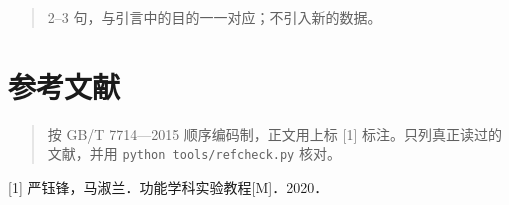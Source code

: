 \documentclass{fdureport}
\begin{document}
\begin{quote}
2--3 句，与引言中的目的一一对应；不引入新的数据。
\end{quote}

\hypertarget{ux53c2ux8003ux6587ux732e}{%
\section*{参考文献}\label{ux53c2ux8003ux6587ux732e}}

\begin{quote}
按 GB/T 7714---2015 顺序编码制，正文用上标 {[}1{]}
标注。只列真正读过的文献，并用 \texttt{python\ tools/refcheck.py} 核对。
\end{quote}

{[}1{]} 严钰锋，马淑兰．功能学科实验教程{[}M{]}．2020．
\end{document}

